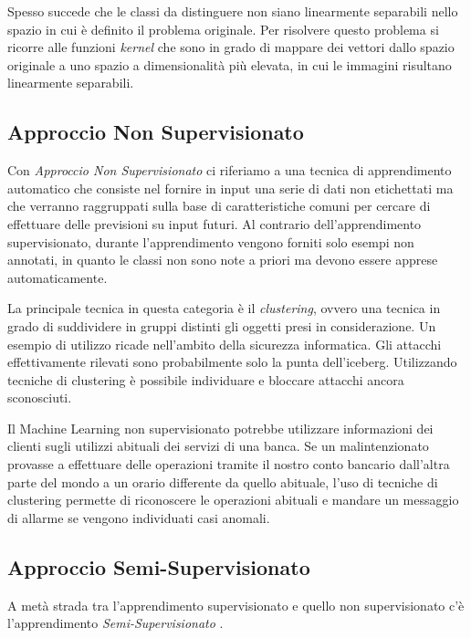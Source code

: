 \documentclass[a4paper,12pt]{report}
\begin{document}
Spesso succede che le classi da distinguere non siano linearmente separabili nello spazio in cui è definito il problema originale. Per risolvere questo problema si ricorre alle funzioni \textit{kernel} che sono in grado di mappare dei vettori dallo spazio originale a uno spazio a dimensionalità più elevata, in cui le immagini risultano linearmente separabili.

\subsection*{Approccio Non Supervisionato}
Con \textit{Approccio Non Supervisionato} \cite{unsupervised_learning} ci riferiamo a una tecnica di apprendimento automatico che consiste nel fornire in input una serie di dati non etichettati ma che verranno raggruppati sulla base di caratteristiche comuni  per cercare di effettuare delle previsioni su input futuri.
Al contrario dell'apprendimento supervisionato, durante l'apprendimento vengono forniti solo esempi non annotati, in quanto le classi non sono note a priori ma devono essere apprese automaticamente.

\bigskip

La principale tecnica in questa categoria è il \textit{clustering}, ovvero una tecnica in grado di suddividere in gruppi distinti  gli oggetti presi in considerazione.
Un esempio di utilizzo ricade nell'ambito della sicurezza informatica. Gli attacchi effettivamente rilevati sono probabilmente solo la punta dell'iceberg. Utilizzando tecniche di clustering è possibile individuare e bloccare attacchi ancora sconosciuti.

Il Machine Learning non supervisionato potrebbe utilizzare informazioni dei clienti sugli utilizzi abituali dei servizi di una banca. Se un malintenzionato provasse a effettuare delle operazioni tramite il nostro conto bancario dall'altra parte del mondo a un orario differente da quello abituale, l'uso di tecniche di clustering permette di riconoscere le operazioni abituali e mandare un messaggio di allarme se vengono individuati casi anomali.

\subsection*{Approccio Semi-Supervisionato}
A metà strada tra l'apprendimento supervisionato e quello non supervisionato c'è l'apprendimento \textit{Semi-Supervisionato} \cite{supervisedlearning}.
\end{document}
